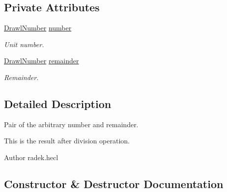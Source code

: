 \subsection*{Private Attributes}
\begin{DoxyCompactItemize}
\item 
\hyperlink{classcom_1_1aarrelaakso_1_1drawl_1_1_drawl_number}{Drawl\+Number} \hyperlink{classcom_1_1aarrelaakso_1_1drawl_1_1_drawl_number_remainder_pair_a8c62602c155e6b1fe737605fe7229b36}{number}
\begin{DoxyCompactList}\small\item\em Unit number. \end{DoxyCompactList}\item 
\hyperlink{classcom_1_1aarrelaakso_1_1drawl_1_1_drawl_number}{Drawl\+Number} \hyperlink{classcom_1_1aarrelaakso_1_1drawl_1_1_drawl_number_remainder_pair_a95c7e55169d65822bbceb08ff2f800dc}{remainder}
\begin{DoxyCompactList}\small\item\em Remainder. \end{DoxyCompactList}\end{DoxyCompactItemize}


\subsection{Detailed Description}
Pair of the arbitrary number and remainder. 

This is the result after division operation.

\begin{DoxyAuthor}{Author}
radek.\+hecl 
\end{DoxyAuthor}


\subsection{Constructor \& Destructor Documentation}
\mbox{\label{classcom_1_1aarrelaakso_1_1drawl_1_1_drawl_number_remainder_pair_aac59fe33b4a1888d48ba7bf4bc0ebaa4}} 
